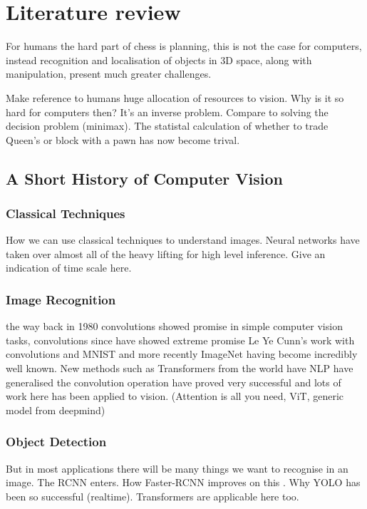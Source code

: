\section{Literature review}
\label{research}
For humans the hard part of chess is planning, this is not the case for computers, instead 
recognition and localisation of objects in 3D space, along with manipulation, present much greater
challenges. \cite{}

Make reference to humans huge allocation of resources to vision. \cite{}
Why is it so hard for computers then? It's an inverse problem. 
Compare to solving the decision problem (minimax).  
The statistal calculation of whether to trade Queen's or block with a pawn has now become trival.  

\subsection{A Short History of Computer Vision}
\subsubsection{Classical Techniques}
How we can use classical techniques to understand images.  Neural networks have taken over almost all of the heavy lifting for high level inference.
Give an indication of time scale here.
\subsubsection{Image Recognition}
the way back in 1980 \cite{} convolutions showed promise in simple computer vision tasks, 
convolutions since have showed extreme promise \cite{}
Le Ye Cunn's work with convolutions \cite{} and MNIST \cite{} and more recently ImageNet \cite{} having become incredibly well known.
New methods such as Transformers from the world have NLP have generalised the convolution operation have proved 
very successful and lots of work here has been applied to vision. \cite{} \cite{} \cite{} (Attention is all you need, ViT, generic model from deepmind)
\subsubsection{Object Detection}
But in most applications there will be many things we want to recognise in an image.  The RCNN \cite{} enters.  How Faster-RCNN improves on this \cite{}.
Why YOLO \cite{} has been so successful (realtime).  Transformers are applicable here too.
